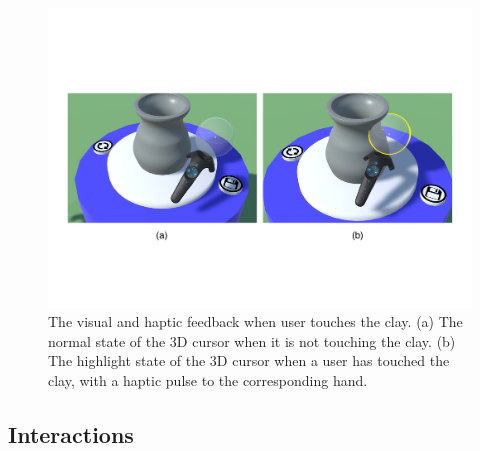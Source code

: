 \documentclass{svjour3}                     %
\begin{document}
\begin{figure}
\includegraphics[width=\textwidth]{fig10}
\caption{The visual and haptic feedback when user touches the clay. (a) The normal state of the 3D cursor when it is not touching the clay. (b) The highlight state of the 3D cursor when a user has touched the clay, with a haptic pulse to the corresponding hand.}
\label{fig:highlight}
\end{figure}



























\subsection{Interactions}
\label{sec:interactions}

\end{document}
